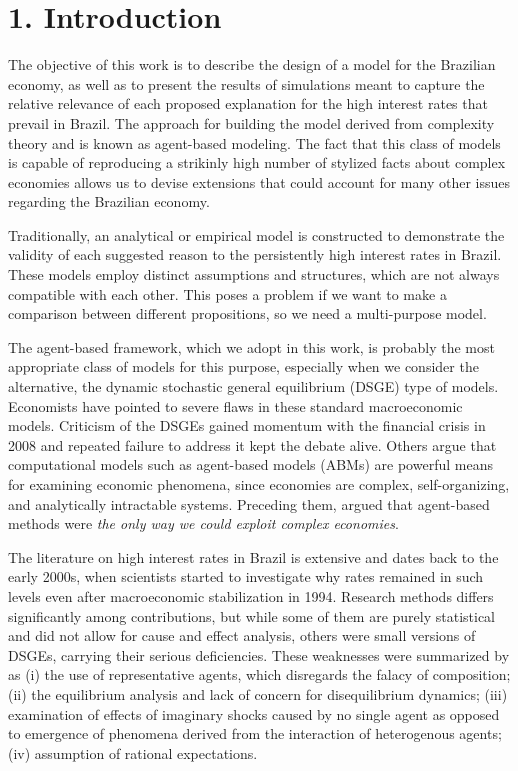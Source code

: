 \documentclass[11pt,]{article}
\begin{document}
\tableofcontents
\listoffigures
\listoftables
\newpage

\section{1. Introduction}\label{introduction}

The objective of this work is to describe the design of a model for the
Brazilian economy, as well as to present the results of simulations
meant to capture the relative relevance of each proposed explanation for
the high interest rates that prevail in Brazil. The approach for
building the model derived from complexity theory and is known as
agent-based modeling. The fact that this class of models is capable of
reproducing a strikinly high number of stylized facts about complex
economies \citep{delligatti1} allows us to devise extensions that could
account for many other issues regarding the Brazilian economy.

Traditionally, an analytical or empirical model is constructed to
demonstrate the validity of each suggested reason to the persistently
high interest rates in Brazil. These models employ distinct assumptions
and structures, which are not always compatible with each other. This
poses a problem if we want to make a comparison between different
propositions, so we need a multi-purpose model.

The agent-based framework, which we adopt in this work, is probably the
most appropriate class of models for this purpose, especially when we
consider the alternative, the dynamic stochastic general equilibrium
(DSGE) type of models. Economists \citep{blanchard1, romer1} have
pointed to severe flaws in these standard macroeconomic models.
Criticism of the DSGEs gained momentum with the financial crisis in 2008
and repeated failure to address it kept the debate alive. Others
\citep{howitt1, colander1} argue that computational models such as
agent-based models (ABMs) are powerful means for examining economic
phenomena, since economies are complex, self-organizing, and
analytically intractable systems. Preceding them, \citet{leijon1} argued
that agent-based methods were \emph{the only way we could exploit
complex economies}.

The literature on high interest rates in Brazil is extensive and dates
back to the early 2000s, when scientists started to investigate why
rates remained in such levels even after macroeconomic stabilization in
1994. Research methods differs significantly among contributions, but
while some of them are purely statistical and did not allow for cause
and effect analysis, others were small versions of DSGEs, carrying their
serious deficiencies. These weaknesses were summarized by
\citet{dilaver} as (i) the use of representative agents, which
disregards the falacy of composition; (ii) the equilibrium analysis and
lack of concern for disequilibrium dynamics; (iii) examination of
effects of imaginary shocks caused by no single agent as opposed to
emergence of phenomena derived from the interaction of heterogenous
agents; (iv) assumption of rational expectations.
\end{document}
